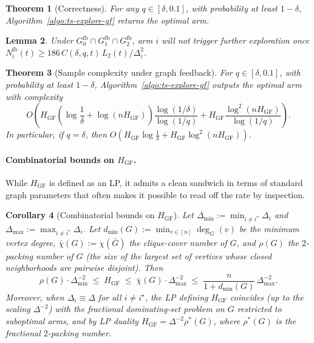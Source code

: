 \documentclass{article}
\newtheorem{theorem}{Theorem}
\newtheorem{lemma}[theorem]{Lemma}
\newtheorem{corollary}[theorem]{Corollary}
\begin{document}
\begin{theorem}[Correctness]\label{thm:correct-fb}
For any $q\in[\delta,0.1]$, with probability at least $1-\delta$, Algorithm~\ref{algo:ts-explore-gf} returns the optimal arm.
\end{theorem}

\begin{lemma}\label{lem:terminate-fb}
Under $G_0^{\mathrm{fb}}\cap G_1^{\mathrm{fb}}\cap G_2^{\mathrm{fb}}$, arm $i$ will not trigger further exploration once
$N_i^{\mathrm{fb}}(t)\ge 186\,C(\delta,q,t)\,L_2(t)/\Delta_i^2$.
\end{lemma}

\begin{theorem}[Sample complexity under graph feedback]\label{thm:main-fb}
For $q\in[\delta,0.1]$, with probability at least $1-\delta$, Algorithm~\ref{algo:ts-explore-gf} outputs the optimal arm with complexity
\[
O\!\left(
H_{\mathrm{GF}}
\left(\log\frac1\delta+\log(nH_{\mathrm{GF}})\right)
\frac{\log(1/\delta)}{\log(1/q)}
+
H_{\mathrm{GF}}
\frac{\log^2(nH_{\mathrm{GF}})}{\log(1/q)}
\right).
\]
In particular, if $q=\delta$, then
$O\!\left(
H_{\mathrm{GF}}\log\frac1\delta
+
H_{\mathrm{GF}}\log^2(nH_{\mathrm{GF}})
\right)$.
\end{theorem}

\paragraph{Combinatorial bounds on $H_{\mathrm{GF}}$.}
While $H_{\mathrm{GF}}$ is defined as an LP, it admits a clean sandwich in terms of standard graph parameters that often makes it possible to read off the rate by inspection.

\begin{corollary}[Combinatorial bounds on $H_{\mathrm{GF}}$]\label{cor:HGF-bounds}
Let $\Delta_{\min}:=\min_{i\neq i^\star}\Delta_i$ and $\Delta_{\max}:=\max_{i\neq i^\star}\Delta_i$. Let $d_{\min}(G):=\min_{v\in[n]}\deg_G(v)$ be the minimum vertex degree, $\bar\chi(G):=\chi(\bar G)$ the clique-cover number of $G$, and $\rho(G)$ the $2$-packing number of $G$ (the size of the largest set of vertices whose closed neighborhoods are pairwise disjoint). Then
\begin{equation}
\rho(G)\cdot\Delta_{\min}^{-2}
\;\le\;
H_{\mathrm{GF}}
\;\le\;
\bar\chi(G)\cdot\Delta_{\max}^{-2}
\;\le\;
\frac{n}{1+d_{\min}(G)}\,\Delta_{\max}^{-2}.
\label{eq:HGF-bounds}
\end{equation}
Moreover, when $\Delta_i\equiv\Delta$ for all $i\neq i^\star$, the LP defining $H_{\mathrm{GF}}$ coincides (up to the scaling $\Delta^{-2}$) with the fractional dominating-set problem on $G$ restricted to suboptimal arms, and by LP duality $H_{\mathrm{GF}}=\Delta^{-2}\rho^*(G)$, where $\rho^*(G)$ is the fractional $2$-packing number.
\end{corollary}
\end{document}

